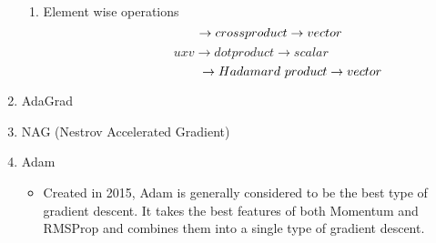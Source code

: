\begin{enumerate}
\begin{enumerate}
        \item Element wise operations
        \[
        \hspace{1.1cm} \rightarrow cross product \rightarrow vector
        \]
        \[
        uxv \rightarrow dot product \rightarrow scalar
        \]
        \[
        \hspace{2.3cm} \rightarrow Hadamard\ product \rightarrow vector
        \]
    \end{enumerate}
    \item AdaGrad
    \item NAG (Nestrov Accelerated Gradient)
    \item Adam
    \begin{itemize}
        \item Created in 2015, Adam is generally considered to be the best type of gradient descent. It takes the best features of both Momentum and RMSProp and combines them into a single type of gradient descent.
    \end{itemize}
\end{enumerate}
